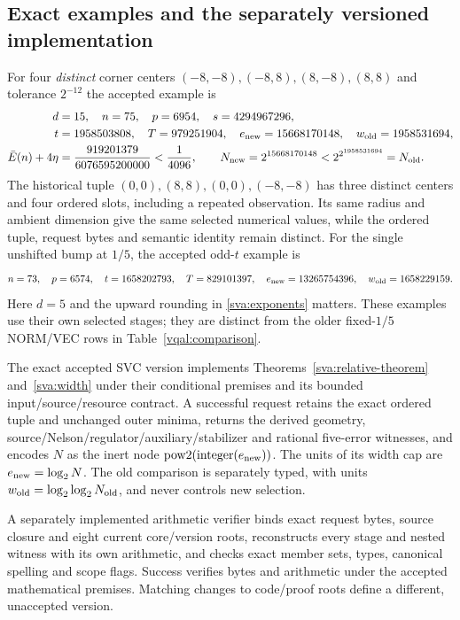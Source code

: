 \subsection{Exact examples and the separately versioned implementation}
\label{sva:examples}

For four \emph{distinct} corner centers $(-8,-8),(-8,8),(8,-8),(8,8)$
and tolerance $2^{-12}$ the accepted example is
\begin{align}\label{sva:corner-example}
 d&=15,\quad n=75,\quad p=6954,\quad s=4294967296,\nonumber\\
 t&=1958503808,\quad T=979251904,\quad
 e_{\rm new}=15668170148,\quad w_{\rm old}=1958531694,\nonumber\\
 \bar E(n)+4\eta&={919201379\over6076595200000}<{1\over4096},
 \qquad N_{\rm new}=2^{15668170148}<2^{2^{1958531694}}=N_{\rm old}.
\end{align}
The historical tuple $(0,0),(8,8),(0,0),(-8,-8)$ has three distinct
centers and four ordered slots, including a repeated observation. Its
same radius and ambient dimension give the same selected numerical
values, while the ordered tuple, request bytes and semantic identity
remain distinct.
For the single unshifted bump at $1/5$, the accepted odd-$t$ example is
\begin{equation}\label{sva:odd-example}
 n=73,\quad p=6574,\quad t=1658202793,\quad T=829101397,
 \quad e_{\rm new}=13265754396,\quad w_{\rm old}=1658229159.
\end{equation}
Here $d=5$ and the upward rounding in \eqref{sva:exponents} matters.
These examples use their own selected stages; they are distinct from the
older fixed-$1/5$ NORM/VEC rows in Table~\ref{vqal:comparison}.

\begin{proposition}
\label{sva:software}
The exact accepted SVC version implements Theorems~\ref{sva:relative-theorem}
and~\ref{sva:width} under their conditional premises and its bounded
input/source/resource contract. A successful request retains the exact
ordered tuple and unchanged outer minima, returns the derived geometry,
source/Nelson/regulator/auxiliary/stabilizer and rational five-error
witnesses, and encodes $N$ as the inert node
$\operatorname{pow2}(\operatorname{integer}(e_{\rm new}))$.
The units of its width cap are $e_{\rm new}=\log_2N$.
The old comparison is separately typed, with units
$w_{\rm old}=\log_2\log_2N_{\rm old}$, and never controls new selection.

A separately implemented arithmetic verifier binds exact request bytes,
source closure and eight current core/version roots, reconstructs every
stage and nested witness with its own arithmetic, and checks exact
member sets, types, canonical spelling and scope flags. Success verifies
bytes and arithmetic under the accepted mathematical premises. Matching
changes to code/proof roots define a different, unaccepted version.
\end{proposition}

